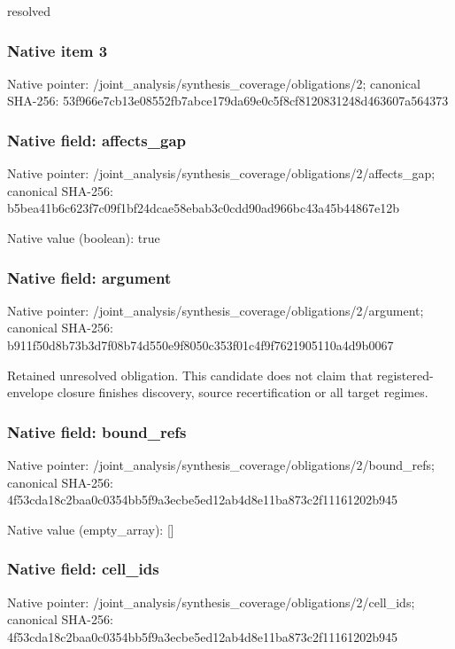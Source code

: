 \documentclass[10pt,a4paper]{article}
\begin{document}
\begingroup\raggedright\sloppy resolved\par\endgroup

\subsubsection{Native item 3}
Native pointer: /joint\_\allowbreak{}analysis/synthesis\_\allowbreak{}coverage/obligations/2; canonical SHA-256: 53f966e7cb13e08552fb7abce179da69e0c5f8cf8120831248d463607a564373

\subsubsection{Native field: affects\_\allowbreak{}gap}
Native pointer: /joint\_\allowbreak{}analysis/synthesis\_\allowbreak{}coverage/obligations/2/affects\_\allowbreak{}gap; canonical SHA-256: b5bea41b6c623f7c09f1bf24dcae58ebab3c0cdd90ad966bc43a45b44867e12b

Native value (boolean): true

\subsubsection{Native field: argument}
Native pointer: /joint\_\allowbreak{}analysis/synthesis\_\allowbreak{}coverage/obligations/2/argument; canonical SHA-256: b911f50d8b73b3d7f08b74d550e9f8050c353f01c4f9f7621905110a4d9b0067

\begingroup\raggedright\sloppy Retained unresolved obligation. This candidate does not claim that registered-envelope closure finishes discovery,\allowbreak{} source recertification or all target regimes.\par\endgroup

\subsubsection{Native field: bound\_\allowbreak{}refs}
Native pointer: /joint\_\allowbreak{}analysis/synthesis\_\allowbreak{}coverage/obligations/2/bound\_\allowbreak{}refs; canonical SHA-256: 4f53cda18c2baa0c0354bb5f9a3ecbe5ed12ab4d8e11ba873c2f11161202b945

Native value (empty\_\allowbreak{}array): []

\subsubsection{Native field: cell\_\allowbreak{}ids}
Native pointer: /joint\_\allowbreak{}analysis/synthesis\_\allowbreak{}coverage/obligations/2/cell\_\allowbreak{}ids; canonical SHA-256: 4f53cda18c2baa0c0354bb5f9a3ecbe5ed12ab4d8e11ba873c2f11161202b945
\end{document}
